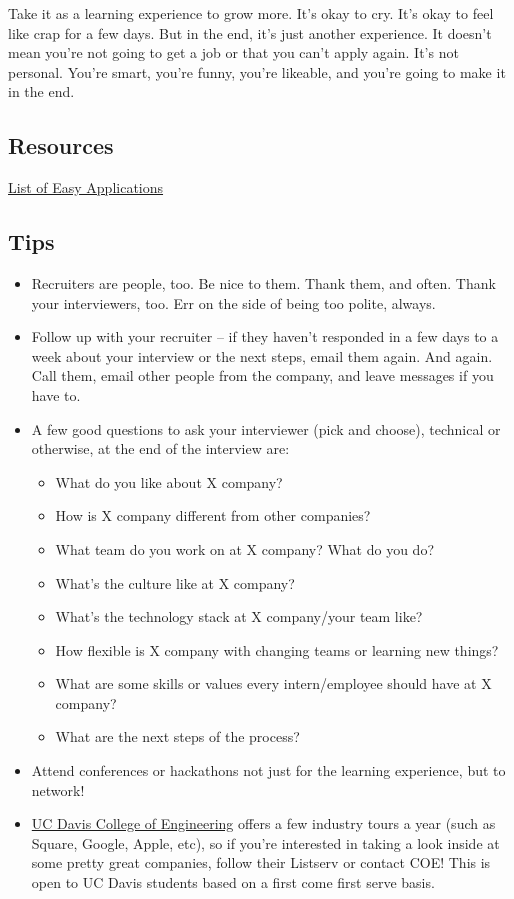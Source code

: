 \documentclass{article}
\begin{document}
Take it as a learning experience to grow more. It's okay to cry. It's okay to
feel like crap for a few days. But in the end, it's just another experience. It
doesn't mean you're not going to get a job or that you can't apply again. It's
not personal. You're smart, you're funny, you're likeable, and you're going to
make it in the end.

\subsection {Resources} 
\href{https://github.com/j-delaney/easy-application}{List of Easy Applications}
\subsection{Tips}
\begin{itemize}
\item Recruiters are people, too. Be nice to them. Thank them, and often. Thank
  your interviewers, too. Err on the side of being too polite, always.
\item Follow up with your recruiter -- if they haven't responded in a few days
  to a week about your interview or the next steps, email them again. And
  again. Call them, email other people from the company, and leave messages if
  you have to.
\item A few good questions to ask your interviewer (pick and choose), technical
  or otherwise, at the end of the interview are:
  \begin{itemize}
  \item What do you like about X company?
  \item How is X company different from other companies?
  \item What team do you work on at X company? What do you do?
  \item What's the culture like at X company?
  \item What's the technology stack at X company/your team like?
  \item How flexible is X company with changing teams or learning new things?
  \item What are some skills or values every intern/employee should have at X
    company?
  \item What are the next steps of the process?
  \end{itemize}
\item Attend conferences or hackathons not just for the learning experience, but
  to network!
\item
  \href{http://engineering.ucdavis.edu/corporate-relations/student-recruitment/company-tours/}{UC Davis College of Engineering}
  offers a few industry tours a year (such as Square, Google, Apple, etc), so if
  you're interested in taking a look inside at some pretty great companies,
  follow their Listserv or contact COE! This is open to UC Davis students based
  on a first come first serve basis.
\end{itemize}
\end{document}
